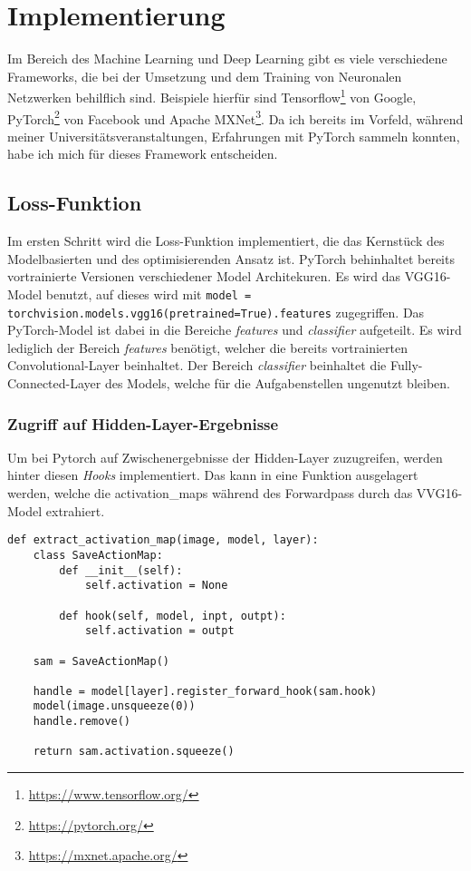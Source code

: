 \chapter{Implementierung}
\label{cha:implementation}

Im Bereich des Machine Learning und Deep Learning gibt es viele verschiedene Frameworks, die bei der Umsetzung und dem Training von Neuronalen Netzwerken
behilflich sind. Beispiele hierfür sind Tensorflow\footnote{\url{https://www.tensorflow.org/}} von Google, PyTorch\footnote{\url{https://pytorch.org/}} von Facebook und Apache MXNet\footnote{\url{https://mxnet.apache.org/}}. Da ich bereits im Vorfeld, während meiner Universitätsveranstaltungen, Erfahrungen mit PyTorch sammeln konnten, habe ich mich für dieses Framework entscheiden.

\section{Loss-Funktion}

Im ersten Schritt wird die Loss-Funktion implementiert, die das Kernstück des Modelbasierten und des optimisierenden Ansatz ist.
PyTorch behinhaltet bereits vortrainierte Versionen verschiedener Model Architekuren. Es wird das VGG16-Model benutzt, auf dieses
wird mit \texttt{model = torchvision.models.vgg16(pretrained=True).features} zugegriffen. Das PyTorch-Model ist dabei in die Bereiche \textit{features} und 
\textit{classifier} aufgeteilt. Es wird lediglich der Bereich \textit{features} benötigt, welcher die bereits vortrainierten Convolutional-Layer beinhaltet.
Der Bereich \textit{classifier} beinhaltet die Fully-Connected-Layer des Models, welche für die Aufgabenstellen ungenutzt bleiben.

\pagebreak

\subsection{Zugriff auf Hidden-Layer-Ergebnisse}

Um bei Pytorch auf Zwischenergebnisse der Hidden-Layer zuzugreifen, werden hinter diesen \textit{Hooks} implementiert. Das kann in eine Funktion ausgelagert werden, welche die \gls{activation_map}s während des Forwardpass durch das VVG16-Model extrahiert.

\begin{listing}[H]
\begin{verbatim}
def extract_activation_map(image, model, layer):
    class SaveActionMap:
        def __init__(self):
            self.activation = None

        def hook(self, model, inpt, outpt):
            self.activation = outpt

    sam = SaveActionMap()

    handle = model[layer].register_forward_hook(sam.hook)
    model(image.unsqueeze(0))
    handle.remove()

    return sam.activation.squeeze()
\end{verbatim}
\end{listing}

